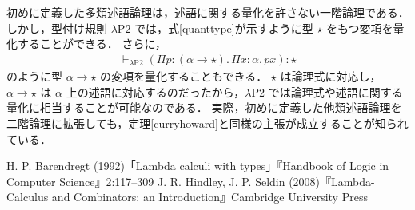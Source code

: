 \documentclass[./main]{subfiles}
\newcommand{\lam}{\lambda}
\newcommand{\bto}{\mathbin{\to}}
\newcommand{\ocl}{\mathord{:}}
\newcommand{\typstar}{\mathord{\star}}
\theoremstyle{definition}
\begin{document}
初めに定義した多類述語論理は，述語に関する量化を許さない一階論理である．
しかし，型付け規則 $ \lam \mathrm{P2} $ では，式\ref{quanttype}が示すように型 $ \typstar $ をもつ変項を量化することができる．
さらに，
\begin{gather*}
\vdash _{\lam \mathrm{P2}} (\Pi p \ocl\, (\alpha \bto \typstar).\, \Pi x \ocl\, \alpha.\, px) \ocl\, \typstar
\end{gather*}
のように型 $ \alpha \bto \typstar $ の変項を量化することもできる．
$ \typstar $ は論理式に対応し，$ \alpha \bto \typstar $ は $ \alpha $ 上の述語に対応するのだったから，$ \lam \mathrm{P2} $ では論理式や述語に関する量化に相当することが可能なのである．
実際，初めに定義した他類述語論理を二階論理に拡張しても，定理\ref{curryhoward}と同様の主張が成立することが知られている．


\begin{thebibliography}{9}
 H. P. Barendregt (1992)「Lambda calculi with types」『Handbook of Logic in Computer Science』2:117--309
 J. R. Hindley, J. P. Seldin (2008)『Lambda-Calculus and Combinators: an Introduction』Cambridge University Press
\end{thebibliography}
\end{document}
